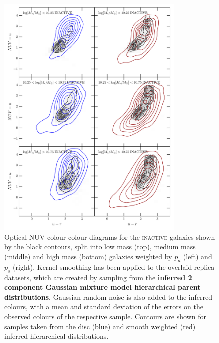 \begin{figure}
\begin{centering}
\includegraphics[width=0.8\textwidth]{starpy/figc2b.pdf}
\caption[Replica colour-colour distributions using a hierarchical method]{Optical-NUV colour-colour diagrams for the \textsc{inactive} galaxies shown by the black contours, split into low mass (top), medium mass (middle) and high mass (bottom) galaxies weighted by $p_d$ (left) and $p_s$ (right). Kernel smoothing has been applied to the overlaid replica datasets, which are created by sampling from the \textbf{inferred 2 component Gaussian mixture model hierarchical parent distributions}. Gaussian random noise is also added to the inferred colours, with a mean and standard deviation of the errors on the observed colours of the respective sample. Contours are shown for samples taken from the disc (blue) and smooth weighted (red) inferred hierarchical distributions.}
\label{replica}
\end{centering}
\end{figure}

